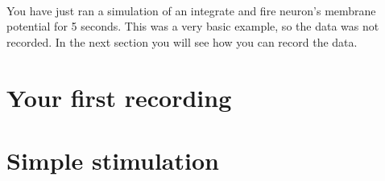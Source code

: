 \paragraph{} You have just ran a simulation of an integrate and fire neuron's membrane potential for 5 seconds. This was a very basic example, so the data was not recorded. In the next section you will see how you can record the data.
\section{Your first recording}

\section{Simple stimulation}
